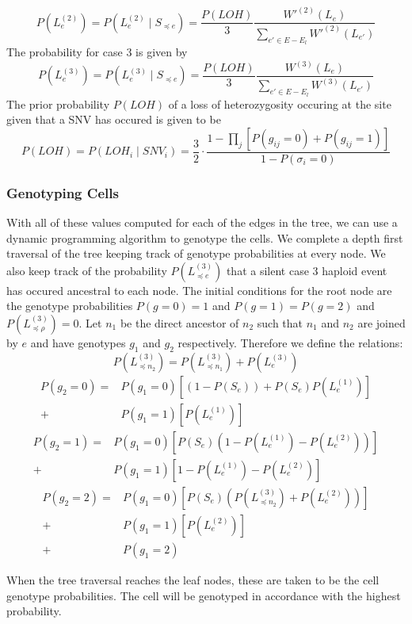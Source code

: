 \documentclass[../../main.tex]{subfiles}
\begin{document}
\begin{equation*}
P(L_e^{(2)}) = P(L_e^{(2)}\mid S_{\preceq e}) = \frac{P(LOH)}{3} \frac{W'^{(2)}(L_e)}{\sum_{e'\in E-E_l}W'^{(2)}(L_{e'})}
\end{equation*}
The probability for case 3 is given by
\begin{equation*}
P(L_e^{(3)}) = P(L_e^{(3)}\mid S_{\preceq e}) = \frac{P(LOH)}{3} \frac{W^{(3)}(L_e)}{\sum_{e'\in E-E_l}W^{(3)}(L_{e'})}
\end{equation*}
The prior probability $P(LOH)$ of a loss of heterozygosity occuring at the site given that a SNV has occured is given to be
\begin{equation*}
P(LOH) = P(LOH_i \mid SNV_i) = \frac{3}{2}\cdot\frac{1-\prod_j\left[P(g_{ij}=0)+P(g_{ij}=1)\right]}{1-P(\sigma_i = 0)}
\end{equation*}

\subsubsection*{Genotyping Cells}
With all of these values computed for each of the edges in the tree, we can use a dynamic programming algorithm to genotype the cells. We complete a depth first traversal of the tree keeping track of genotype probabilities at every node. We also keep track of the probability $P(L_{\preceq e}^{(3)})$ that a silent case 3 haploid event has occured ancestral to each node. The initial conditions for the root node are the genotype probabilities $P(g=0)=1$ and $P(g=1)=P(g=2)$ and $P(L_{\preceq \rho}^{(3)}) = 0$. Let $n_1$ be the direct ancestor of $n_2$ such that $n_1$ and $n_2$ are joined by $e$ and have genotypes $g_1$ and $g_2$ respectively. Therefore we define the relations:
\begin{equation*}
P(L^{(3)}_{\preceq n_2}) = P(L^{(3)}_{\preceq n_1}) +P(L^{(3)}_e)
\end{equation*}
\begin{align*}
P(g_2 = 0) = &P(g_1=0)\left[(1-P(S_e))+P(S_e)P(L^{(1)}_e)\right]\\
+ &P(g_1 = 1)\left[P(L^{(1)}_e)\right]
\end{align*}
\begin{align*}
P(g_2 = 1) = &P(g_1=0)\left[P(S_e)(1-P(L^{(1)}_e)-P(L^{(2)}_e))\right]\\
+ &P(g_1 = 1)\left[1-P(L^{(1)}_e)-P(L^{(2)}_e)\right]
\end{align*}
\begin{align*}
P(g_2=2) = &P(g_1=0)\left[P(S_e)(P(L^{(3)}_{\preceq n_2}) + P(L^{(2)}_e))\right]\\
+ &P(g_1=1)\left[P(L^{(2)}_e)\right]\\
+ &P(g_1=2)
\end{align*}

When the tree traversal reaches the leaf nodes, these are taken to be the cell genotype probabilities. The cell will be genotyped in accordance with the highest probability.
\end{document}
